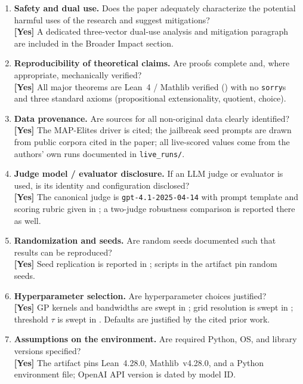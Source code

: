 \begin{enumerate}[leftmargin=1.9em,itemsep=0.25em]
\item \textbf{Safety and dual use.} Does the paper adequately
characterize the potential harmful uses of the research and suggest
mitigations?
\\\textbf{[Yes]} A dedicated three-vector dual-use analysis and
mitigation paragraph are included in the Broader Impact section.

\item \textbf{Reproducibility of theoretical claims.} Are proofs
complete and, where appropriate, mechanically verified?
\\\textbf{[Yes]} All major theorems are Lean~4 / Mathlib verified
() with no \texttt{sorry}s and three standard
axioms (propositional extensionality, quotient, choice).

\item \textbf{Data provenance.} Are sources for all non-original data
clearly identified?
\\\textbf{[Yes]} The MAP-Elites driver is cited; the jailbreak seed
prompts are drawn from public corpora cited in the paper; all
live-scored values come from the authors' own runs documented in
\texttt{live\_runs/}.

\item \textbf{Judge model / evaluator disclosure.} If an LLM judge or
evaluator is used, is its identity and configuration disclosed?
\\\textbf{[Yes]} The canonical judge is \texttt{gpt-4.1-2025-04-14}
with prompt template and scoring rubric given in
; a two-judge robustness comparison is
reported there as well.

\item \textbf{Randomization and seeds.} Are random seeds documented
such that results can be reproduced?
\\\textbf{[Yes]} Seed replication is reported in
; scripts in the artifact pin random
seeds.

\item \textbf{Hyperparameter selection.} Are hyperparameter choices
justified?
\\\textbf{[Yes]} GP kernels and bandwidths are swept in
; grid resolution is swept in
; threshold $\tau$ is swept in
. Defaults are justified by the cited prior work.

\item \textbf{Assumptions on the environment.} Are required Python,
OS, and library versions specified?
\\\textbf{[Yes]} The artifact pins Lean~4.28.0, Mathlib~v4.28.0,
and a Python environment file; OpenAI API version is dated by
model ID.


\end{enumerate}
